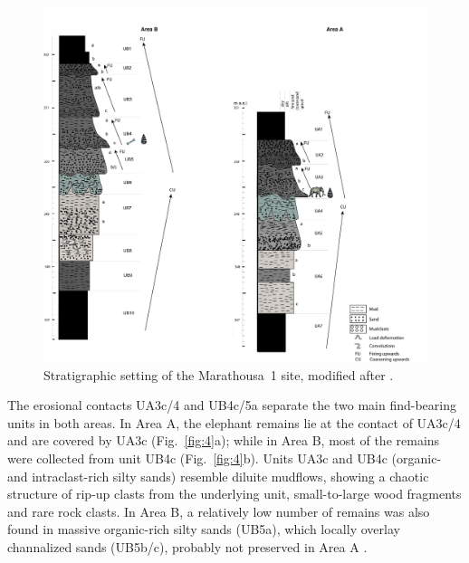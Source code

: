 \documentclass[preprint,authoryear,times]{elsarticle} %
\begin{document}
\begin{figure}[]
  \centering
  \includegraphics[width=1\textwidth]{../artwork/Fig3.pdf}
  \caption{Stratigraphic setting of the Marathousa~1 site, modified after \cite{Karkanas}.}
  \label{fig:3}
\end{figure}

The erosional contacts UA3c/4 and UB4c/5a separate the two main find-bearing units in both areas. In Area A, the elephant remains lie at the contact of UA3c/4 and are covered by UA3c (Fig.~\ref{fig:4}a); while in Area B, most of the remains were collected from unit UB4c (Fig.~\ref{fig:4}b). Units UA3c and UB4c (organic- and intraclast-rich silty sands) resemble diluite mudflows, showing a chaotic structure of rip-up clasts from the underlying unit, small-to-large wood fragments and rare rock clasts. In Area B, a relatively low number of remains was also found in massive organic-rich silty sands (UB5a), which locally overlay channalized sands (UB5b/c), probably not preserved in Area A \citep{Karkanas}.
\end{document}
